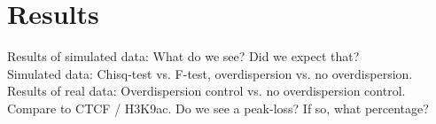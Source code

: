 \section{Results}

Results of simulated data: What do we see? Did we expect that?\\
Simulated data: Chisq-test vs. F-test, overdispersion vs. no overdispersion.\\
Results of real data: Overdispersion control vs. no overdispersion control.\\
Compare to CTCF / H3K9ac. Do we see a peak-loss? If so, what percentage?
  
  
  
  